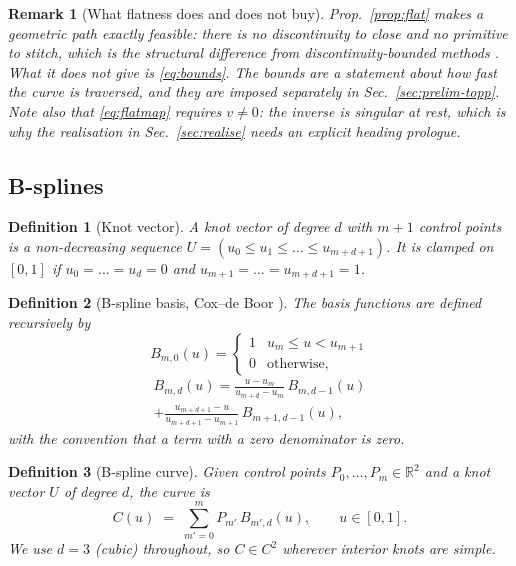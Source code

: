 \documentclass[conference]{IEEEtran}
\newtheorem{definition}{Definition}
\newtheorem{remark}{Remark}
\newcommand{\R}{\mathbb{R}}
\begin{document}
\begin{remark}[What flatness does and does not buy]
Prop.~\ref{prop:flat} makes a \emph{geometric} path exactly feasible: there is no
discontinuity to close and no primitive to stitch, which is the structural difference from
discontinuity-bounded methods \cite{dbcbs2024,dblacam2025}. What it does not give is
\eqref{eq:bounds}. The bounds are a statement about \emph{how fast the curve is traversed},
and they are imposed separately in Sec.~\ref{sec:prelim-topp}. Note also that
\eqref{eq:flatmap} requires $v \neq 0$: the inverse is singular at rest, which is why the
realisation in Sec.~\ref{sec:realise} needs an explicit heading prologue.
\end{remark}

\subsection{B-splines}
\label{sec:prelim-spline}

\begin{definition}[Knot vector]
A \emph{knot vector} of degree $d$ with $m+1$ control points is a non-decreasing sequence
$U = (u_0 \le u_1 \le \dots \le u_{m+d+1})$. It is \emph{clamped} on $[0,1]$ if
$u_0 = \dots = u_d = 0$ and $u_{m+1} = \dots = u_{m+d+1} = 1$.
\end{definition}

\begin{definition}[B-spline basis, Cox--de Boor \cite{deboor1972}]
\label{def:basis}
The basis functions are defined recursively by
\begin{equation}
  B_{m,0}(u) = \begin{cases} 1 & u_m \le u < u_{m+1}\\ 0 & \text{otherwise,}\end{cases}
  \label{eq:coxdeboor0}
\end{equation}
\begin{multline}
  B_{m,d}(u) = \frac{u-u_m}{u_{m+d}-u_m}\,B_{m,d-1}(u)\\
             + \frac{u_{m+d+1}-u}{u_{m+d+1}-u_{m+1}}\,B_{m+1,d-1}(u),
  \label{eq:coxdeboor}
\end{multline}
with the convention that a term with a zero denominator is zero.
\end{definition}

\begin{definition}[B-spline curve]
Given control points $P_0,\dots,P_m \in \R^2$ and a knot vector $U$ of degree $d$, the
curve is
\begin{equation}
  C(u) \;=\; \sum_{m'=0}^{m} P_{m'} \, B_{m',d}(u), \qquad u \in [0,1].
  \label{eq:curve}
\end{equation}
We use $d = 3$ (cubic) throughout, so $C \in C^{2}$ wherever interior knots are simple.
\end{definition}
\end{document}

